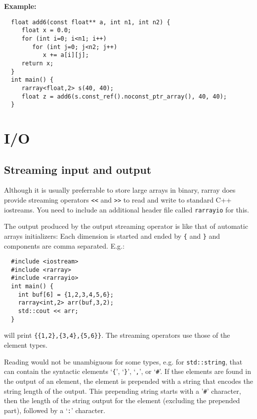 \documentclass[11pt,twoside]{article}
\begin{document}
\noindent
{\bf Example:}
\vspace{-5pt}\begin{framed}\vspace{-14pt}%
\begin{verbatim}
  float add6(const float** a, int n1, int n2) {
     float x = 0.0;
     for (int i=0; i<n1; i++)
        for (int j=0; j<n2; j++)
           x += a[i][j];
     return x;
  }
  int main() {
     rarray<float,2> s(40, 40);
     float z = add6(s.const_ref().noconst_ptr_array(), 40, 40);
  }
\end{verbatim}%
\vspace{-14pt}
\end{framed}

\section{I/O}

\subsection{Streaming input and output}

Although it is usually preferrable to store large arrays in binary, rarray does provide streaming operators \texttt{<<} and \texttt{>>} to read and write to standard C++ iostreams.  You need to include an additional header file called \texttt{rarrayio} for this.

The output produced by the output streaming operator is like that of automatic arrays initializers: Each dimension is started and ended by \texttt{\{} and \texttt{\}} and components are comma separated. 
E.g.:\vspace{-9pt}
\begin{framed}\vspace{-18pt}%
\begin{verbatim}
  #include <iostream>
  #include <rarray>
  #include <rarrayio>
  int main() {
    int buf[6] = {1,2,3,4,5,6};
    rarray<int,2> arr(buf,3,2);
    std::cout << arr;
  }
\end{verbatim}%
\vspace{-12pt}
\end{framed}\vspace{-8pt}\noindent
will print \texttt{\{\{1,2\},\{3,4\},\{5,6\}\}}. The streaming operators use those of the element types. 

Reading would not be unambiguous for some types, e.g. for \texttt{std::string}, that can contain the syntactic elements `\texttt{\{}', `\texttt{\}}', `\texttt{,}', or `\texttt{\#}'.  If thse elements are found in the output of an element, the element is prepended with a string that encodes the string length of the output. This prepending string starts with a '\texttt\#' character, then the length of the string output for the element  (excluding the prepended part), followed by a `\texttt:' character.
\end{document}
